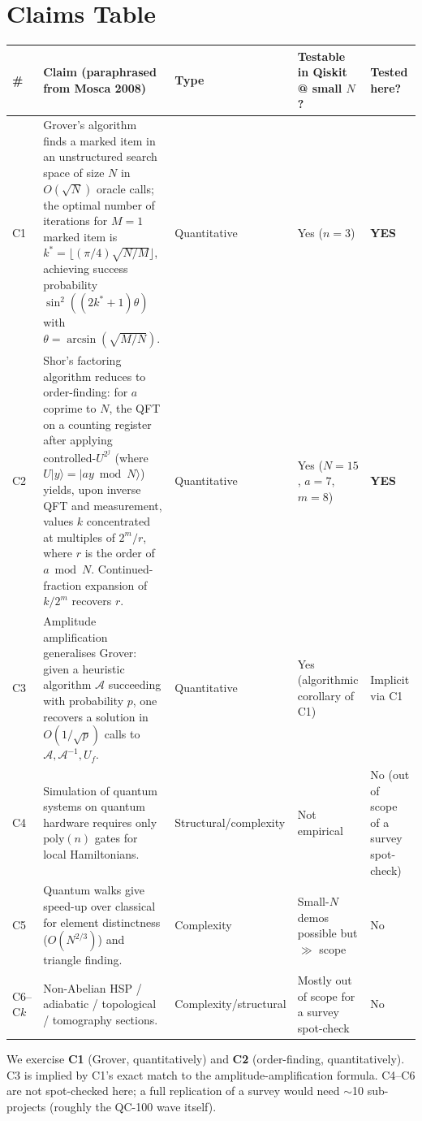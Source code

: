 \documentclass[11pt]{article}
\begin{document}
\section{Claims Table}
\begin{center}
\begin{tabular}{@{}p{0.7cm}p{6.8cm}p{2.2cm}p{2.2cm}p{2.4cm}@{}}
\toprule
\# & Claim (paraphrased from Mosca 2008) & Type & Testable in Qiskit @ small $N$? & Tested here? \\
\midrule
C1 & Grover's algorithm finds a marked item in an unstructured search space of size $N$ in $O(\sqrt{N})$ oracle calls; the optimal number of iterations for $M{=}1$ marked item is $k^*=\lfloor(\pi/4)\sqrt{N/M}\rfloor$, achieving success probability $\sin^2((2k^*{+}1)\theta)$ with $\theta=\arcsin(\sqrt{M/N})$. & Quantitative & Yes ($n{=}3$) & \textbf{YES} \\
C2 & Shor's factoring algorithm reduces to order-finding: for $a$ coprime to $N$, the QFT on a counting register after applying controlled-$U^{2^j}$ (where $U|y\rangle{=}|ay\bmod N\rangle$) yields, upon inverse QFT and measurement, values $k$ concentrated at multiples of $2^m/r$, where $r$ is the order of $a\bmod N$. Continued-fraction expansion of $k/2^m$ recovers $r$. & Quantitative & Yes ($N{=}15$, $a{=}7$, $m{=}8$) & \textbf{YES} \\
C3 & Amplitude amplification generalises Grover: given a heuristic algorithm $\mathcal A$ succeeding with probability $p$, one recovers a solution in $O(1/\sqrt p)$ calls to $\mathcal A,\mathcal A^{-1},U_f$. & Quantitative & Yes (algorithmic corollary of C1) & Implicit via C1 \\
C4 & Simulation of quantum systems on quantum hardware requires only $\mathrm{poly}(n)$ gates for local Hamiltonians. & Structural/complexity & Not empirical & No (out of scope of a survey spot-check) \\
C5 & Quantum walks give speed-up over classical for element distinctness ($O(N^{2/3})$) and triangle finding. & Complexity & Small-$N$ demos possible but $\gg$ scope & No \\
C6--C$k$ & Non-Abelian HSP / adiabatic / topological / tomography sections. & Complexity/structural & Mostly out of scope for a survey spot-check & No \\
\bottomrule
\end{tabular}
\end{center}

We exercise \textbf{C1} (Grover, quantitatively) and \textbf{C2} (order-finding, quantitatively). C3 is implied by C1's exact match to the amplitude-amplification formula. C4--C6 are not spot-checked here; a full replication of a survey would need $\sim$10 sub-projects (roughly the QC-100 wave itself).
\end{document}
